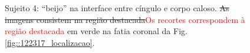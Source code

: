  \begin{figure}[H]
\centering
    \hfill
    \caption{Sujeito 4: ``beijo'' na interface entre cíngulo e corpo caloso. \sout{As imagens consistem na região destacada}\textcolor{red}{Os recortes correspondem à região destacada} em verde na fatia coronal da Fig. \ref{fig::122317_localizacao}.
    }
    \label{fig::122317_kissing}
\end{figure}

